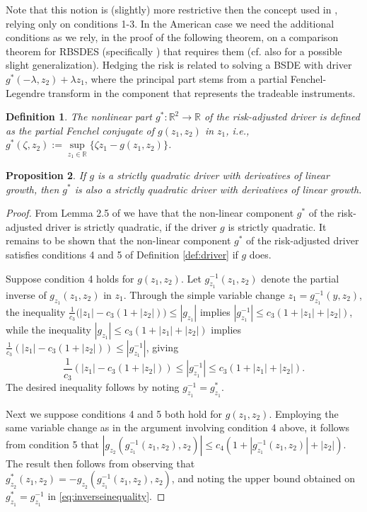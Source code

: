 \documentclass{article}
\newtheorem{definition}{Definition}[section]
\newtheorem{proposition}[definition]{Proposition}
\begin{document}
Note that this notion is (slightly) more restrictive then the concept used in \cite{SS15}, relying only on conditions 1-3. In the American case we need the additional conditions as we rely, in the proof of the following theorem, on a comparison theorem for RBSDES (specifically \cite[Proposition 3.2]{KLQT02}) that requires them (cf. also \cite{Mor13} for a possible slight generalization). Hedging the risk is related to solving a BSDE with driver $g^*(-\lambda, z_2)+\lambda z_1$, where the principal part stems from a partial Fenchel-Legendre transform in the component that represents the tradeable instruments.

\begin{definition} 
	The nonlinear part $g^* : \mathbb{R}^{2} \to \mathbb{R}$ of the risk-adjusted driver is defined as the partial Fenchel conjugate of $g(z_{1},z_{2})$ in $z_{1}$, i.e., $g^*(\zeta,z_{2}) := \sup \limits_{z_{1} \in \mathbb{R}} \{ \zeta z_{1} - g(z_{1},z_{2})\}$.
\end{definition}

\begin{proposition}
	If $g$ is a strictly quadratic driver with derivatives of linear growth, then $g^*$ is also a strictly quadratic driver with derivatives of linear growth.
\end{proposition} 

\begin{proof}
	From Lemma 2.5 of \cite{SS15} we have that  the non-linear component $g^*$ of the risk-adjusted driver is strictly quadratic, if the driver $g$ is strictly quadratic. It remains to 			be shown that the non-linear component $g^*$ of the risk-adjusted driver satisfies conditions 4 and 5 of Definition \ref{def:driver} if $g$ does.
	
	Suppose condition 4 holds for $g(z_{1},z_{2})$.  Let $g_{z_{1}}^{-1}(z_{1},z_{2})$ denote the partial inverse of $g_{z_{1}}(z_{1},z_{2})$ in $z_{1}$.  Through the 
	simple variable change $z_{1} = g_{z_{1}}^{-1}(y,z_{2})$, the inequality $\frac{1}{c_{3}} \bigl( |z_{1}| - c_{3}(1 + |z_{2}|) \bigr) \leq |g_{z_{1}}|$ implies 
	$|g_{z_{1}}^{-1}| \leq c_{3}(1 + |z_{1}| + |z_{2}|)$, while the inequality $|g_{z_{1}}| \leq c_{3}(1 + |z_{1}| + |z_{2}|)$ implies 
	$\frac{1}{c_{3}}(|z_{1}| - c_{3}(1 + |z_{2}|)) \leq |g_{z_{1}}^{-1}|$, giving 
	\begin{equation} \label{eq:inverseinequality}
		\frac{1}{c_{3}}(|z_{1}| - c_{3}(1 + |z_{2}|)) \leq |g_{z_{1}}^{-1}| \leq c_{3}(1 + |z_{1}| + |z_{2}|).
	\end{equation}
	The desired inequality follows by noting $g_{z_{1}}^{-1} = g^*_{z_{1}}$.
	
	Next we suppose conditions 4 and 5 both hold for $g(z_{1},z_{2})$.  Employing the same variable change as in the argument involving condition 4 above, it follows from 
	condition 5 that $|g_{z_{2}}(g_{z_{1}}^{-1}(z_{1},z_{2}),z_{2})| \leq c_{4}(1 + |g_{z_{1}}^{-1}(z_{1},z_{2})| + |z_{2}|)$.  The result then follows from observing 
	that $g^*_{z_{2}}(z_{1},z_{2}) = -g_{z_{2}}(g_{z_{1}}^{-1}(z_{1},z_{2}),z_{2})$, and noting the upper bound obtained on $g^*_{z_{1}} = g_{z_{1}}^{-1}$ in 
	\eqref{eq:inverseinequality}.
\end{proof}
\end{document}
